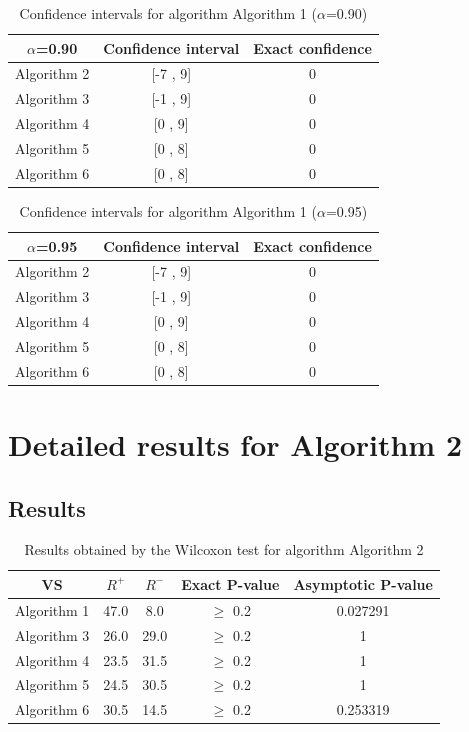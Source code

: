 \documentclass[a4paper,10pt]{article}
\begin{document}
\begin{table}[!htp]
\centering\small
\begin{tabular}{
|c|c|c|}
\hline
 $\alpha$=0.90 & Confidence interval & Exact confidence \\ \hline 
Algorithm 2 & [-7 , 9] & 0\\ \hline 
Algorithm 3 & [-1 , 9] & 0\\ \hline 
Algorithm 4 & [0 , 9] & 0\\ \hline 
Algorithm 5 & [0 , 8] & 0\\ \hline 
Algorithm 6 & [0 , 8] & 0\\ \hline 

\end{tabular}
\caption{Confidence intervals for algorithm Algorithm 1 ($\alpha$=0.90)}
\end{table}
\begin{table}[!htp]
\centering\small
\begin{tabular}{
|c|c|c|}
\hline
 $\alpha$=0.95 & Confidence interval & Exact confidence \\ \hline 
Algorithm 2 & [-7 , 9] & 0\\ \hline 
Algorithm 3 & [-1 , 9] & 0\\ \hline 
Algorithm 4 & [0 , 9] & 0\\ \hline 
Algorithm 5 & [0 , 8] & 0\\ \hline 
Algorithm 6 & [0 , 8] & 0\\ \hline 

\end{tabular}
\caption{Confidence intervals for algorithm Algorithm 1 ($\alpha$=0.95)}
\end{table}

 \clearpage 


\section{Detailed results for Algorithm 2}


\subsection{Results}

\begin{table}[!htp]
\centering\small
\begin{tabular}{
|c|c|c|c|c|}
\hline
 VS & $R^{+}$ & $R^{-}$ & Exact P-value & Asymptotic P-value \\ \hline 
Algorithm 1 & 47.0 & 8.0 & $\geq$ 0.2 & 0.027291\\ \hline 
Algorithm 3 & 26.0 & 29.0 & $\geq$ 0.2 & 1\\ \hline 
Algorithm 4 & 23.5 & 31.5 & $\geq$ 0.2 & 1\\ \hline 
Algorithm 5 & 24.5 & 30.5 & $\geq$ 0.2 & 1\\ \hline 
Algorithm 6 & 30.5 & 14.5 & $\geq$ 0.2 & 0.253319\\ \hline 

\end{tabular}
\caption{Results obtained by the Wilcoxon test for algorithm Algorithm 2}
\end{table}
\end{document}
